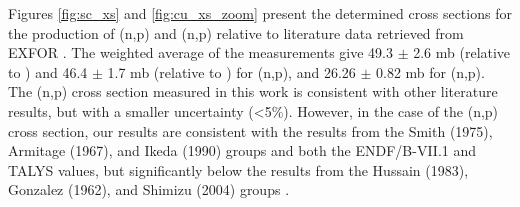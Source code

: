 \documentclass[5p]{elsarticle}
\newcommand{\comment}[1]{\todo[color=blue!20!white,inline]{ASV: #1}}
\begin{document}
Figures \ref{fig:sc_xs} and \ref{fig:cu_xs_zoom} present the determined cross sections for the production of  (n,p) and (n,p)  relative to literature data retrieved from EXFOR \cite{Otuka2014272,PhysRev.114.565,doi:10.1143/JPSJ.17.1215,paulsen1967cross,doi:10.1139/p72-336,Smith1975,King1979,Hussain1983,Ikeda1991,Shimizu2004543,PhysRev.126.271,Armitage1967,Ikeda1990,Senga2000,Shimizu2004975}.
The weighted average of the measurements give   49.3 $\pm$ 2.6 mb (relative to ) and 46.4 $\pm$ 1.7 mb (relative to )   for (n,p),   and 26.26 $\pm$  0.82 mb for  (n,p).
The (n,p) cross section measured in this work is consistent with  other literature results, but with a smaller uncertainty (\textless 5\%).
However, in the case of the (n,p) cross section, our results are consistent with the results from the Smith (1975), Armitage (1967), and Ikeda (1990) groups \cite{Smith1975,Armitage1967,Ikeda1990} and both the ENDF/B-VII.1 \cite{Chadwick2011} and TALYS \cite{Koning2012}  values, but significantly below the results from the Hussain (1983), Gonzalez (1962), and Shimizu (2004) groups \cite{Hussain1983,PhysRev.126.271,Shimizu2004975}.
 





\end{document}
